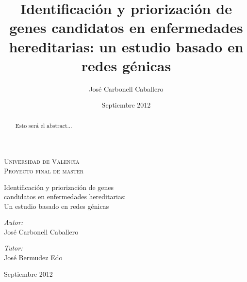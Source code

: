 \documentclass[10pt,a4paper]{report}
\title{Identificación y priorización de genes candidatos en enfermedades hereditarias: un estudio basado en redes génicas}
\author{José Carbonell Caballero}
\date{Septiembre 2012}
\begin{document}
\begin{titlepage}
	\begin{center}


\textsc{\LARGE Universidad de Valencia}\\[1.5cm]
\textsc{\Large Proyecto final de master}\\[0.5cm]

\bigskip
\bigskip
\bigskip

{ \huge 
Identificación y priorización de genes \\
candidatos en enfermedades hereditarias: \\
Un estudio basado en redes génicas \\
}



\bigskip
\bigskip
\bigskip
\bigskip
\bigskip
\bigskip
\bigskip


\begin{minipage}{0.4\textwidth}
\begin{flushleft} \large
\emph{Autor:}\\
José Carbonell Caballero
\end{flushleft}
\end{minipage}
\begin{minipage}{0.4\textwidth}
\begin{flushright} \large
\emph{Tutor:} \\
José Bermudez Edo
\end{flushright}
\end{minipage}


\vfill

Septiembre 2012
\end{center}

\end{titlepage}

\pagebreak

\begin{abstract}
Esto será el abstract...
\end{abstract}

\pagebreak

\tableofcontents

\pagebreak











 
\end{document}
